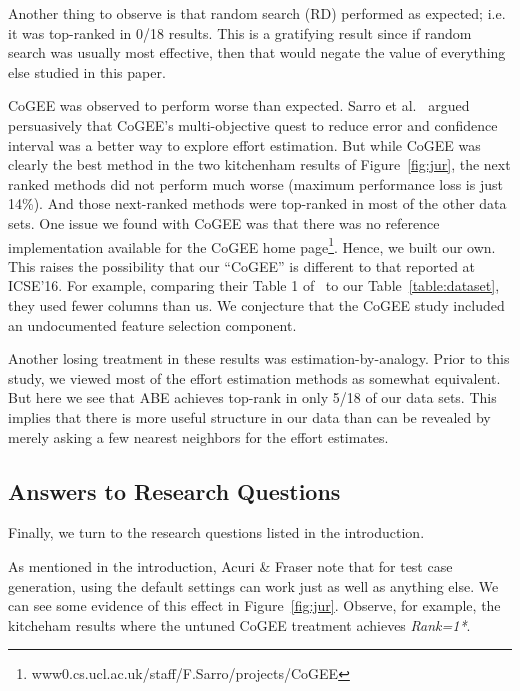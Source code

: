 Another thing to observe is that  random search (RD)  performed as expected; i.e. it was top-ranked in 0/18 results. This is a gratifying result since if random search was usually most effective, then that would negate the value of everything else studied in this paper.

CoGEE was observed to perform worse than expected. Sarro et al.~\cite{sarro2016multi} argued persuasively that CoGEE's
 multi-objective quest to reduce error and confidence interval was a better way to explore effort estimation. But while CoGEE was clearly the best method in the two kitchenham results of
 Figure~\ref{fig:jur}, the next ranked methods did not perform much worse (maximum performance loss is just 14\%). And those next-ranked methods were top-ranked in most of the other data sets. 
One issue we found with CoGEE was that there was no reference implementation 
available for the CoGEE   home page\footnote{www0.cs.ucl.ac.uk/staff/F.Sarro/projects/CoGEE}. Hence, we   built our own. This  
raises the possibility that our ``CoGEE'' is different to that reported at ICSE'16. For example, comparing their Table 1 of~\cite{sarro2016multi} to our Table~\ref{table:dataset}, 
they used fewer columns than us.
We conjecture that the CoGEE study included an undocumented feature selection component. 

Another losing treatment in these results was estimation-by-analogy. Prior to
this study, we viewed most of the effort estimation methods as somewhat equivalent.
But here we see that ABE achieves top-rank in only 5/18 of our data sets.  This implies that there is more useful structure in our  data than can be revealed
by merely asking a few nearest neighbors for the effort estimates.



\subsection{Answers to Research Questions}

Finally, we turn to the research questions listed in the introduction.

 
 As mentioned in the introduction, 
 Acuri \& Fraser note that for
 test case generation,   using the default settings
can work just as well as anything else. 
 We can see some evidence of this effect in  Figure~\ref{fig:jur}. Observe, for example, the
  kitcheham results where the untuned CoGEE treatment achieves {\em Rank=1*}.  
  
